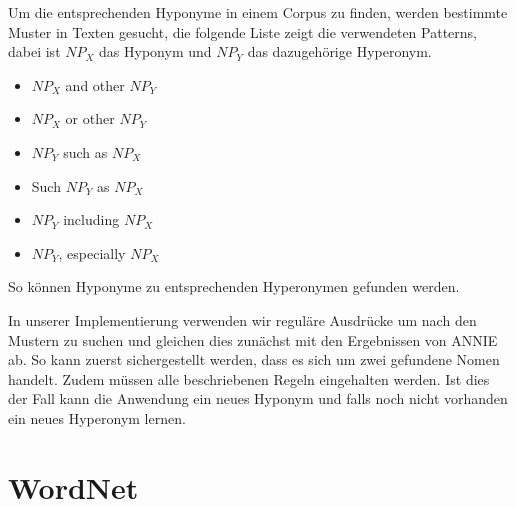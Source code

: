 Um die entsprechenden Hyponyme in einem Corpus zu finden, werden
bestimmte Muster in Texten gesucht, die folgende Liste zeigt die
verwendeten Patterns, dabei ist $NP_{X}$ das Hyponym und $NP_{Y}$ das
dazugehörige Hyperonym.

\begin{itemize}
\item $NP_{X}$ and other $NP_{Y}$
\item $NP_{X}$ or other $NP_{Y}$
\item $NP_{Y}$ such as $NP_{X}$
\item Such $NP_{Y}$ as $NP_{X}$
\item $NP_{Y}$ including $NP_{X}$
\item $NP_{Y}$, especially $NP_{X}$
\end{itemize}

So können Hyponyme zu entsprechenden Hyperonymen gefunden werden.
\cite{Snow:2004}

In unserer Implementierung verwenden wir reguläre Ausdrücke um nach
den Mustern zu suchen und gleichen dies zunächst mit den Ergebnissen
von ANNIE ab. So kann zuerst sichergestellt werden, dass es sich um
zwei gefundene Nomen handelt. Zudem müssen alle beschriebenen Regeln
eingehalten werden. Ist dies der Fall kann die Anwendung ein neues
Hyponym und falls noch nicht vorhanden ein neues Hyperonym lernen.


\section{WordNet}

